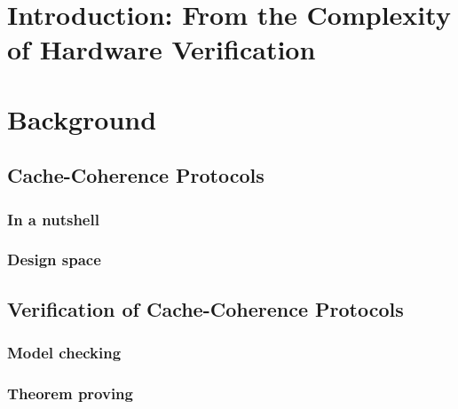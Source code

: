 \chapter{Introduction: From the Complexity of Hardware Verification}

\chapter{Background}

\section{Cache-Coherence Protocols}

\subsection{In a nutshell}

\subsection{Design space}

\section{Verification of Cache-Coherence Protocols}

\subsection{Model checking}

\subsection{Theorem proving}

